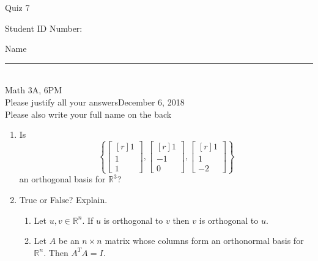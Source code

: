 \documentclass[12pt]{article}
\begin{document}
\begin{flushleft} 
\centerline{\LARGE{Quiz 7}} 
\vspace{5 mm}
{Student ID Number:}\hfill  
{Name \rule {2 in}{0.01in}}\\
Math 3A, 6PM
\\
{Please justify all your answers}\hfill {December 6, 2018}
\\
{Please also write your full name on the back} 

\medskip
\end{flushleft}

\begin{enumerate}
	\item Is
	\[
	\left\{\begin{bmatrix*}[r]
		1\\1\\1
	\end{bmatrix*}, \begin{bmatrix*}[r]
		1\\-1\\0
	\end{bmatrix*}, \begin{bmatrix*}[r]
		1\\1\\-2
	\end{bmatrix*}\right\}
	\]
	an orthogonal basis for $\mathbb{R}^3$?

	\vfill

	\item True or False? Explain.
	\begin{enumerate}
		\item Let $u,v\in \mathbb{R}^n$. If $u$ is orthogonal to $v$ then $v$ is orthogonal to $u$.

		\vfill

		\item Let $A$ be an $n\times n$ matrix whose columns form an orthonormal basis for $\mathbb{R}^n$. Then $A^TA = I$.
		\vfill
	\end{enumerate}
\end{enumerate}


\end{document}
